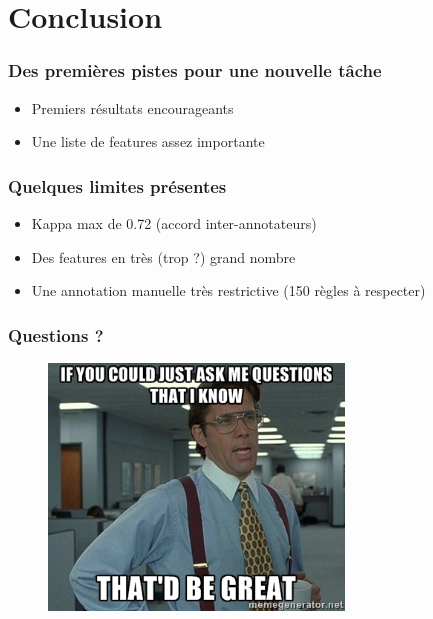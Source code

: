 \documentclass[10pt]{beamer}
\begin{document}
\section{Conclusion}
\label{sec:conclusion}

\begin{frame}
  \frametitle{Des premières pistes pour une nouvelle tâche}
  \begin{itemize}
  \item Premiers résultats encourageants 
  \item Une liste de features assez importante
  \end{itemize}

\end{frame}

\begin{frame}
  \frametitle{Quelques limites présentes}
  \begin{itemize}
  \item Kappa max de 0.72 (accord inter-annotateurs) 
  \item Des features en très (trop ?) grand nombre 
  \item Une annotation manuelle très restrictive (150 règles à respecter)
  \end{itemize}
\end{frame}

\begin{frame}
  \frametitle{Questions ?}
  \begin{figure}[h]
    \centering
    \includegraphics[width=0.7\textwidth]{questions}
  \end{figure}
\end{frame}
\end{document}
